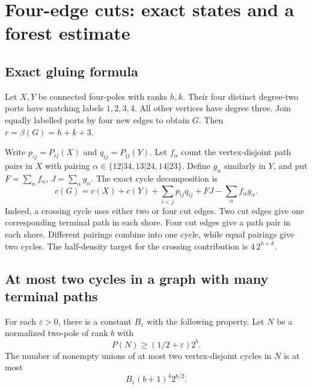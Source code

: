 \section{Four-edge cuts: exact states and a forest estimate}
\label{sec:four-cut-states}

\subsection{Exact gluing formula}
Let $X,Y$ be connected four-poles with ranks $h,k$.
Their four distinct degree-two ports have matching labels $1,2,3,4$.
All other vertices have degree three.
Join equally labelled ports by four new edges to obtain $G$.
Then $r=\beta(G)=h+k+3$.

Write $p_{ij}=P_{ij}(X)$ and $q_{ij}=P_{ij}(Y)$.
Let $f_\alpha$ count the vertex-disjoint path pairs in $X$ with pairing
$\alpha\in\{12|34,13|24,14|23\}$.
Define $g_\alpha$ similarly in $Y$, and put $F=\sum_\alpha f_\alpha$,
$J=\sum_\alpha g_\alpha$.
The exact cycle decomposition is
\begin{equation}\label{eq:four-cut-exact}
 c(G)=c(X)+c(Y)+\sum_{i<j}p_{ij}q_{ij}
       +FJ-\sum_\alpha f_\alpha g_\alpha.
\end{equation}
Indeed, a crossing cycle uses either two or four cut edges.
Two cut edges give one corresponding terminal path in each shore.
Four cut edges give a path pair in each shore.
Different pairings combine into one cycle, while equal pairings give two cycles.
The half-density target for the crossing contribution is $4\,2^{h+k}$.

\subsection{At most two cycles in a graph with many terminal paths}

\begin{lemma}
\label{lem:high-path-two-cycle-packings}
For each $\varepsilon>0$, there is a constant $B_\varepsilon$ with the
following property. Let $N$ be a normalized two-pole of rank $b$ with
\[
 P(N)\ge(1/2+\varepsilon)2^b.
\]
The number of nonempty unions of at most two vertex-disjoint cycles in $N$
is at most
\[
 B_\varepsilon(b+1)^4 2^{b/2}.
\]
\end{lemma}

